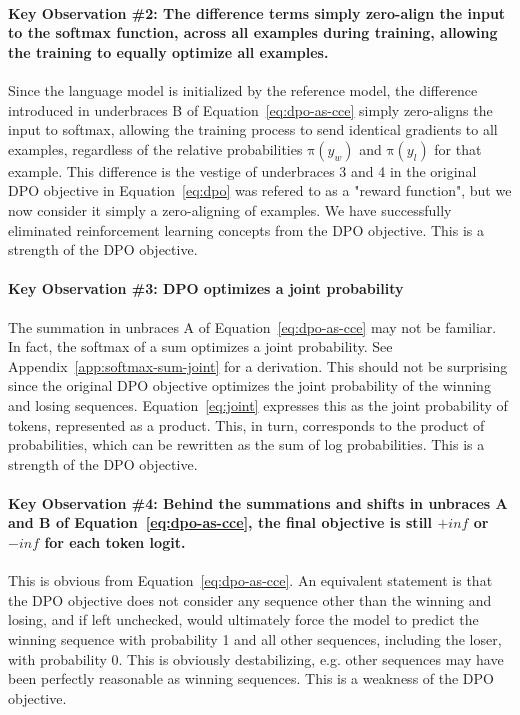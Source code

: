 \documentclass[twoside,11pt]{article}
\begin{document}
\paragraph{Key Observation \#2: The difference terms simply zero-align
the input to the softmax function, across all examples during training,
allowing the training to equally optimize all examples.} 
Since
the language model is initialized by the reference model,
the difference introduced in underbraces B of Equation~\ref{eq:dpo-as-cce}
simply zero-aligns
the input to softmax, allowing the training process to send identical
gradients to all examples, regardless of the relative probabilities
$\mathrm{\pi}(y_w)$ and $\mathrm{\pi}(y_l)$ for that example. 
This difference is the
vestige of underbraces 3 and 4 in the original DPO objective in Equation~\ref{eq:dpo}
was refered to as a "reward function", 
but we now consider it simply a zero-aligning of examples. We have
successfully eliminated reinforcement learning concepts from the DPO objective. 
This is a strength of the DPO objective. 

\paragraph{Key Observation \#3: DPO optimizes a joint probability}
The summation in unbraces A of Equation~\ref{eq:dpo-as-cce}
may not be familiar. In fact, the softmax of a sum optimizes a joint probability.
See Appendix~\ref{app:softmax-sum-joint}
for a derivation. 
This should not be surprising since the original DPO objective 
optimizes the joint probability of the winning and losing sequences. 
Equation~\ref{eq:joint} expresses this as the joint probability of 
tokens, represented as a product. This, in turn, corresponds to the 
product of probabilities, which can be rewritten as the sum of log probabilities.
This is a strength of the DPO objective. 

\paragraph{Key Observation \#4: Behind the summations and shifts
in unbraces A and B of Equation~\ref{eq:dpo-as-cce}, 
the final objective is still $+inf$ or $-inf$ for each token logit.} 
This
is obvious from Equation~\ref{eq:dpo-as-cce}. An equivalent statement is that
the DPO objective does not consider any sequence other than the
winning and losing, and if left unchecked, would ultimately force
the model to predict the winning sequence with probability 1 and all
other sequences, including the loser, with probability 0. This is obviously
destabilizing, e.g. other sequences may have been perfectly
reasonable as winning sequences. This is a weakness
of the DPO objective. 
\end{document}
